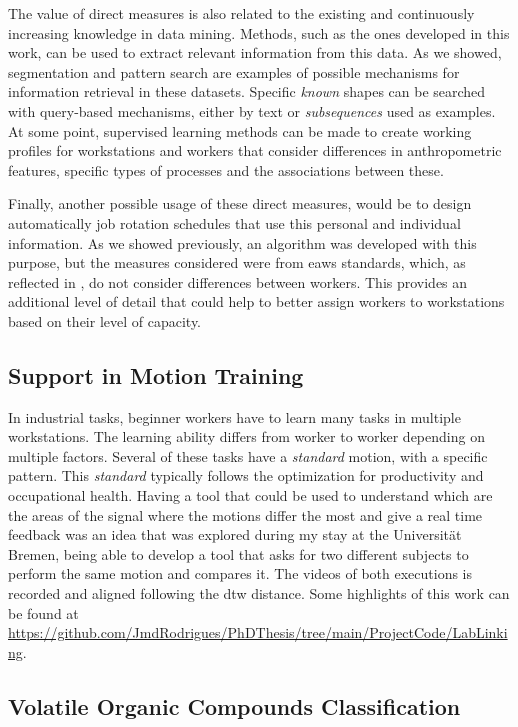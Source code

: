 The value of direct measures is also related to the existing and continuously increasing knowledge in data mining. Methods, such as the ones developed in this work, can be used to extract relevant information from this data. As we showed, segmentation and pattern search are examples of possible mechanisms for information retrieval in these datasets. Specific \textit{known} shapes can be searched with query-based mechanisms, either by text or \textit{subsequences} used as examples. At some point, supervised learning methods can be made to create working profiles for workstations and workers that consider differences in anthropometric features, specific types of processes and the associations between these. 
\par
Finally, another possible usage of these direct measures, would be to design automatically job rotation schedules that use this personal and individual information. As we showed previously, an algorithm was developed with this purpose, but the measures considered were from \gls{eaws} standards, which, as reflected in \cite{sara}, do not consider differences between workers. This provides an additional level of detail that could help to better assign workers to workstations based on their level of capacity.

\subsection{Support in Motion Training}

In industrial tasks, beginner workers have to learn many tasks in multiple workstations. The learning ability differs from worker to worker depending on multiple factors. Several of these tasks have a \textit{standard} motion, with a specific pattern. This \textit{standard} typically follows the optimization for productivity and occupational health. Having a tool that could be used to understand which are the areas of the signal where the motions differ the most and give a real time feedback was an idea that was explored during my stay at the Universität Bremen, being able to develop a tool that asks for two different subjects to perform the same motion and compares it. The videos of both executions is recorded and aligned following the \gls{dtw} distance. Some highlights of this work can be found at \url{https://github.com/JmdRodrigues/PhDThesis/tree/main/ProjectCode/LabLinking}.

\subsection{Volatile Organic Compounds Classification}

